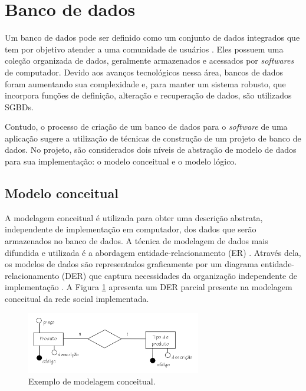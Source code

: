\section{Banco de dados}
\label{fundBD}

Um banco de dados pode ser definido como um conjunto de dados integrados que tem por objetivo atender a uma comunidade de usuários \cite{heuser}. Eles possuem uma coleção organizada de dados, geralmente armazenados e acessados por \textit{softwares} de computador. Devido aos avanços tecnológicos nessa área, bancos de dados foram aumentando sua complexidade e, para manter um sistema robusto, que incorpora funções de definição, alteração e recuperação de dados, são utilizados SGBDs.

Contudo, o processo de criação de um banco de dados para o \textit{software} de uma aplicação sugere a utilização de técnicas de construção de um projeto de banco de dados. No projeto, são considerados dois níveis de abstração de modelo de dados para sua implementação: o modelo conceitual e o modelo lógico.

\subsection{Modelo conceitual}
\label{fundBDModelagem}

A modelagem conceitual é utilizada para obter uma descrição abstrata, independente de implementação em computador, dos dados que serão armazenados no banco de dados. A técnica de modelagem de dados mais difundida e utilizada é a abordagem entidade-relacionamento (ER) \cite{heuser}. Através dela, os modelos de dados são representados graficamente por um diagrama entidade-relacionamento (DER) que captura necessidades da organização independente de implementação \cite{peterChen1976}. A Figura \ref{modelagemBDExemplol} apresenta um DER parcial presente na modelagem conceitual da rede social implementada.

\begin{figure}[h]
    \caption{Exemplo de modelagem conceitual.}
       	\begin{center}
            \includegraphics[width=0.68\textwidth]{figuras/modelo-conceitual.png}
        \end{center}
    \label{modelagemBDExemplol}
\end{figure}

